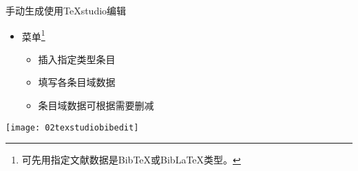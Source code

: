 \documentclass[fontset = none, t]{ctexbeamer}
\begin{document}
\begin{frame}[fragile]{手动生成}{使用TeXstudio编辑}
  \begin{spacing}{1.3}
    \begin{itemize}
    \item {}菜单\footnote[frame,2]{可先用指定文献数据是Bib\TeX 或Bib\LaTeX 类型。}
      \begin{itemize}
      \item 插入指定类型条目
      \item 填写各条目域数据
      \item 条目域数据可根据需要删减
      \end{itemize}
    \end{itemize}
    \begin{center}
      \texttt{[image: 02texstudiobibedit]}
    \end{center}
  \end{spacing}  
\end{frame}
\end{document}

